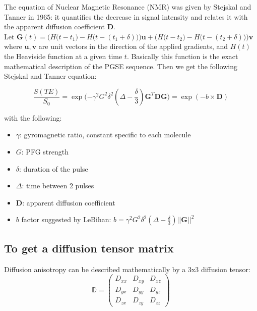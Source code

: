 The equation of Nuclear Magnetic Resonance (NMR) was given by Stejskal and Tanner in 1965: it quantifies the decrease in signal intensity and relates it with the apparent diffusion coefficient $\mathbf{D}$.\\
Let $\mathbf{G}(t) = \Big(H\big(t - t_1\big) - H\big(t - (t_1 + \delta)\big)\Big)\mathbf{u} + \Big(H\big(t - t_2\big) - H\big(t - (t_2 + \delta)\big)\Big) \mathbf{v}$ \\
where $\mathbf{u}, \mathbf{v}$ are unit vectors in the direction of the applied gradients, and $H(t)$ the Heaviside function at a given time $t$. Basically this function is the exact mathematical description of the PGSE sequence. Then we get the following Stejskal and Tanner equation:

\begin{equation} \label{eq:tanner}
\frac{S(TE)}{S_0} = \exp\Big({-\gamma^2G^2\delta^2(\Delta - \frac{\delta}{3})\mathbf{G}^T\mathbf{D}\mathbf{G}\Big)} = \exp (-b \times \mathbf{D})
\end{equation}

with the following:

\begin{itemize}
    \item $\gamma$: gyromagnetic ratio, constant specific to each molecule
    \item $G$: PFG strength
    \item $\delta$: duration of the pulse
    \item $\Delta$: time between 2 pulses
    \item $\mathbf{D}$: apparent diffusion coefficient
    \item $b$ factor suggested by LeBihan: $b = \gamma^2G^2\delta^2(\Delta - \frac{\delta}{3})||\mathbf{G}||^2$
\end{itemize}

\subsection{To get a diffusion tensor matrix} \label{diffusion_tensor_matrix}

Diffusion anisotropy can be described mathematically by a 3x3 diffusion tensor:
\begin{equation}
    \mathbb{D} = \begin{pmatrix}
    D_{xx} & D_{xy} & D_{xz} \\
    D_{yx} & D_{yy} & D_{yz} \\
    D_{zx} & D_{zy} & D_{zz}
    \end{pmatrix}
\end{equation}


